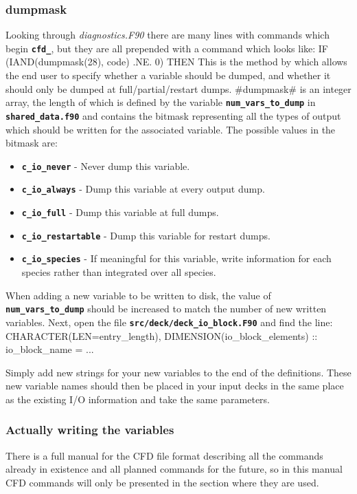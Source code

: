 \documentclass[12pt,a4paper]{article}
\newcommand{\inlinecode}[1]{{\color{warwickred} \bf\texttt{#1}}}
\newcommand{\EPOCH}{{\color{warwickdark}\fontfamily{phv}\selectfont{EPOCH}}}
\newenvironment{boxverbatim}{\lboxverbatim{none}}{\endlboxverbatim}
\begin{document}
\subsubsection{dumpmask}
Looking through {\it diagnostics.F90} there are many lines with commands which
begin \inlinecode{cfd\_}, but they are all prepended with a command which looks
like:
\begin{boxverbatim}
  IF (IAND(dumpmask(28), code) .NE. 0) THEN
\end{boxverbatim}
This is the method by which {\EPOCH} allows the end user to specify whether a
variable should be dumped, and whether it should only be dumped at
full/partial/restart dumps. #dumpmask# is an integer array, the length of
which is defined by the variable \inlinecode{num\_vars\_to\_dump} in
\inlinecode{shared\_data.f90} and contains the bitmask representing all the
types of output which should be written for the associated variable. The
possible values in the bitmask are:

\begin{itemize}
\item \inlinecode{c\_io\_never} - Never dump this variable.
\item \inlinecode{c\_io\_always} - Dump this variable at every output dump.
\item \inlinecode{c\_io\_full} - Dump this variable at full dumps.
\item \inlinecode{c\_io\_restartable} - Dump this variable for restart dumps.
\item \inlinecode{c\_io\_species} - If meaningful for this variable, write
  information for each species rather than integrated over all species.
\end{itemize}

When adding a new variable to be written to disk, the value of
\inlinecode{num\_vars\_to\_dump} should be increased to match the number of new
written variables. Next, open the file \inlinecode{src/deck/deck\_io\_block.F90}
and find the line:
\begin{boxverbatim}
  CHARACTER(LEN=entry_length), DIMENSION(io_block_elements) :: io_block_name = ...
\end{boxverbatim}

Simply add new strings for your new variables to the end of the
definitions. These new variable names should then be placed in your input decks
in the same place as the existing I/O information and take the same parameters.

\subsubsection{Actually writing the variables}
There is a full manual for the CFD file format describing all the commands
already in existence and all planned commands for the future, so in this
manual CFD commands will only be presented in the section where they are used.
\end{document}
